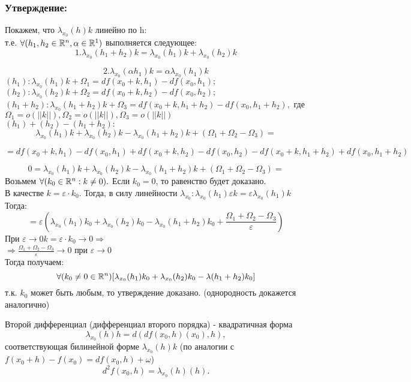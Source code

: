\subsubsection{Утверждение:}
Покажем, что $\lambda_{x_0}(h)k$ линейно по h:
\\
т.е. $\forall(h_1,h_2\in\mathbb{R}^n, \alpha\in\mathbb{R}^1)$ выполняется следующее:
$$
1. \lambda_{x_0}(h_1+h_2)k=\lambda_{x_0}(h_1)k+\lambda_{x_0}(h_2)k
$$

$$
2. \lambda_{x_0}(\alpha h_1)k = \alpha\lambda_{x_0}(h_1)k
$$
\dokvo
$(h_1):\lambda_{x_0}(h_1)k+\Omega_1 = df(x_0+k,h_1) - df(x_0,h_1);$
\\
$(h_2):\lambda_{x_0}(h_2)k+\Omega_2 = df(x_0+k,h_2) - df(x_0,h_2);$
\\
$(h_1+h_2):\lambda_{x_0}(h_1+h_2)k+\Omega_3 = df(x_0+k, h_1+h_2) - df(x_0,h_1+h_2),$
где $\Omega_1=o(||k||), \Omega_2 = o(||k||), \Omega_3 = o(||k||)$
\\
$(h_1)+(h_2)-(h_1+h_2):$
\\
$$\lambda_{x_0}(h_1)k+\lambda_{x_0}(h_2)k-\lambda_{x_0}(h_1+h_2)k+(\Omega_1+\Omega_2-\Omega_3) = $$

$$
= df(x_0+k,h_1)-df(x_0,h_1)+df(x_0+k,h_2)-df(x_0,h_2)-df(x_0+k,h_1+h_2)+df(x_0,h_1+h_2)
$$

$$
0 = \lambda_{x_0}(h_1)k+\lambda_{x_0}(h_2)k-\lambda_{x_0}(h_1+h_2)k+(\Omega_1+\Omega_2-\Omega_3) = 
$$
Возьмем $\forall(k_0\in\mathbb{R}^n:k\ne 0).$ Если $k_0=0$, то равенство будет доказано.
\\
В качестве $k=\varepsilon\cdot k_0.$ Тогда, в силу линейности $\lambda_{x_0}:\lambda_{x_0}(h_1)\varepsilon k = \varepsilon\lambda_{x_0}(h_1)k$ Тогда:
$$
= \varepsilon(\lambda_{x_0}(h_1)k_0+\lambda_{x_0}(h_2)k_0-\lambda_{x_0}(h_1+h_2)k_0+\frac{\Omega_1+\Omega_2-\Omega_3}{\varepsilon})
$$
При $\varepsilon\to 0  k=\varepsilon\cdot k_0\to 0\Rightarrow$
\\
$\Rightarrow \frac{\Omega_1+\Omega_2-\Omega_3}{\varepsilon}\to 0$ при $\varepsilon\to 0$
\\
Тогда получаем:
$$
\forall(k_0\ne 0\in\mathbb{R}^n)[\lambda_{x_0}(h_1)k_0+\lambda_{x_0}(h_2)k_0-\lambda(h_1+h_2)k_0]
$$
т.к. $k_0$ может быть любым, то утверждение доказано.
(однородность докажется аналогично)
\dokno
\begin{opred}
Второй дифференциал (дифференциал второго порядка) - квадратичная форма 
$$
\lambda_{x_0}(h)h=d(df(x_0,h)(x_0),h),
$$
соответствующая билинейной форме $\lambda_{x_0}(h)k$ (по аналогии с $f(x_0+h)-f(x_0) = df(x_0,h)+\omega$)
$$
d^2f(x_0,h)=\lambda_{x_0}(h)(h).
$$
\end{opred}

